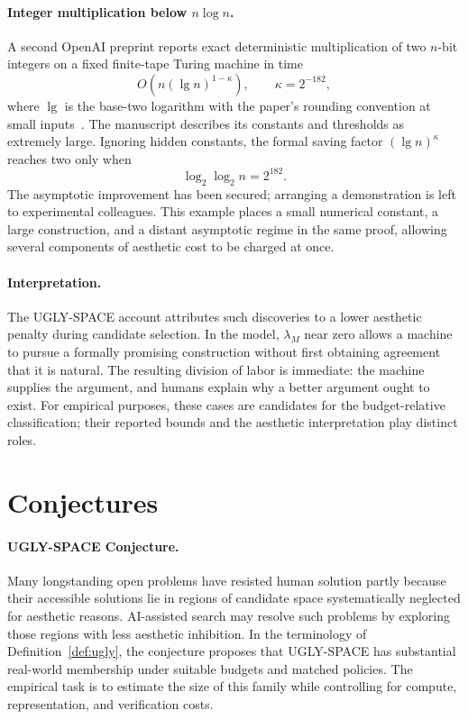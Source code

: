 \documentclass[11pt]{article}
\theoremstyle{remark}
\begin{document}
\paragraph{Integer multiplication below $n\log n$.}
A second OpenAI preprint reports exact deterministic multiplication of
two $n$-bit integers on a fixed finite-tape Turing machine in time
\[
 O\!\left(n(\lg n)^{1-\kappa}\right),
 \qquad \kappa=2^{-182},
\]
where $\lg$ is the base-two logarithm with the paper's rounding convention
at small inputs~\cite{openai2026multiplication}. The manuscript describes
its constants and thresholds as extremely large. Ignoring hidden constants,
the formal saving factor $(\lg n)^\kappa$ reaches two only when
\[
 \log_2\log_2 n=2^{182}.
\]
The asymptotic improvement has been secured; arranging a demonstration is
left to experimental colleagues. This example places a small numerical
constant, a large construction, and a distant asymptotic regime in the same
proof, allowing several components of aesthetic cost to be charged at once.

\paragraph{Interpretation.}
The UGLY-SPACE account attributes such discoveries to a lower aesthetic
penalty during candidate selection. In the model, $\lambda_M$ near zero
allows a machine to pursue a formally promising construction without first
obtaining agreement that it is natural. The resulting division of labor is
immediate: the machine supplies the argument, and humans explain why a
better argument ought to exist. For empirical purposes, these cases are
candidates for the budget-relative classification; their reported bounds
and the aesthetic interpretation play distinct roles.

\section{Conjectures}\label{sec:conjectures}

\paragraph{UGLY-SPACE Conjecture.}
Many longstanding open problems have resisted human solution partly because
their accessible solutions lie in regions of candidate space systematically
neglected for aesthetic reasons. AI-assisted search may resolve such problems
by exploring those regions with less aesthetic inhibition. In the terminology
of Definition~\ref{def:ugly}, the conjecture proposes that UGLY-SPACE has
substantial real-world membership under suitable budgets and matched
policies. The empirical task is to estimate the size of this family while
controlling for compute, representation, and verification costs.
\end{document}
